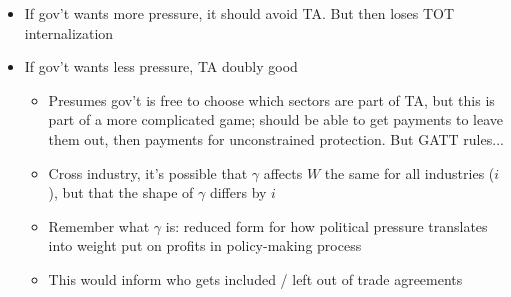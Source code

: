 \documentclass[12pt]{article}
\newcommand{\ga}{\gamma}
\begin{document}
\begin{itemize}
\begin{itemize}
				\begin{itemize}
					\item If gov't wants more pressure, it should avoid TA. But then loses TOT internalization
					\item If gov't wants less pressure, TA doubly good
						\begin{itemize}
							\item Presumes gov't is free to choose which sectors are part of TA, but this is part of a more complicated game; should be able to get payments to leave them out, then payments for unconstrained protection. But GATT rules...
							\item Cross industry, it's possible that $\ga$ affects $W$ the same for all industries ($i$), but that the shape of $\ga$ differs by $i$
							\item Remember what $\ga$ is: reduced form for how political pressure translates into weight put on profits in policy-making process
							\item This would inform who gets included / left out of trade agreements
						\end{itemize}
					\end{itemize}
		\end{itemize}
\end{itemize}
\end{document}
